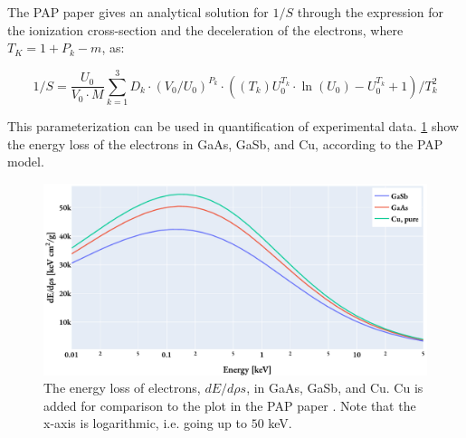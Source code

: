 The PAP paper gives an analytical solution for $1/S$ through the expression for the ionization cross-section and the deceleration of the electrons, where $ T_K = 1 + P_k - m$, as:

\begin{equation}
    \label{eq:theory:quantitative:pap:calculation_of_F:dE_d_rho_s:analytical}
    1/S = \frac{U_0}{V_0 \cdot M} \sum \limits_{k=1}^{3} D_k \cdot (V_0/U_0)^{P_k} \cdot ((T_k)U_0^{T_k} \cdot \ln(U_0)-U_0^{T_k}+1)/T_k^2
\end{equation}




This parameterization can be used in quantification of experimental data.
\cref{fig:PAP:energy_loss_electrons_dE_drhos} show the energy loss of the electrons in GaAs, GaSb, and Cu, according to the PAP model.


\begin{figure}[htbp]
    \centering
    \includegraphics[width=0.8\linewidth]{figures/PAP_energy_loss_dE_drhos.pdf}
    \caption{
        The energy loss of electrons, $dE/d\rho s$,  in GaAs, GaSb, and Cu.
        Cu is added for comparison to the plot in the PAP paper \cite[Fig. 4]{pap_1991}.
        Note that the x-axis is logarithmic, i.e. going up to $50$ keV.
    }
    \label{fig:PAP:energy_loss_electrons_dE_drhos}
\end{figure}




